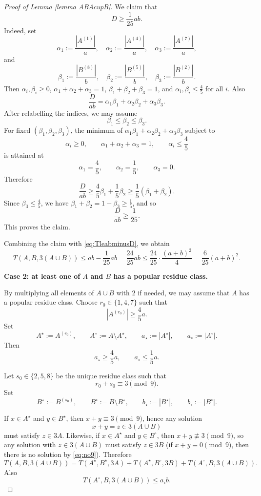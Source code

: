 \documentclass[12pt, notitlepage]{amsart}
\numberwithin{equation}{section}
\theoremstyle{remark}
\theoremstyle{definition}
\theoremstyle{remark}
\numberwithin{equation}{section}
\begin{document}
\begin{proof}[Proof of Lemma \ref{lemma ABAcupB}]
We claim that
\[
D\ge \frac1{25}ab.
\]
Indeed, set
\[
\alpha_1:=\frac{|A^{(1)}|}{a},\quad
\alpha_2:=\frac{|A^{(4)}|}{a},\quad
\alpha_3:=\frac{|A^{(7)}|}{a},
\]
and
\[
\beta_1:=\frac{|B^{(8)}|}{b},\quad
\beta_2:=\frac{|B^{(5)}|}{b},\quad
\beta_3:=\frac{|B^{(2)}|}{b}.
\]
Then $\alpha_i,\beta_i\ge 0$, $\alpha_1+\alpha_2+\alpha_3=1$, $\beta_1+\beta_2+\beta_3=1$, and $\alpha_i,\beta_i\le \frac45$ for all $i$. Also
\[
\frac{D}{ab}=\alpha_1\beta_1+\alpha_2\beta_2+\alpha_3\beta_3.
\]
After relabelling the indices, we may assume
\[
\beta_1\le \beta_2\le \beta_3.
\]
For fixed $(\beta_1,\beta_2,\beta_3)$, the minimum of $\alpha_1\beta_1+\alpha_2\beta_2+\alpha_3\beta_3$ subject to
\[
\alpha_i\ge 0,\qquad \alpha_1+\alpha_2+\alpha_3=1,\qquad \alpha_i\le \frac45
\]
is attained at
\[
\alpha_1=\frac45,\qquad \alpha_2=\frac15,\qquad \alpha_3=0.
\]
Therefore
\[
\frac{D}{ab}\ge \frac45\beta_1+\frac15\beta_2\ge \frac15(\beta_1+\beta_2).
\]
Since $\beta_3\le \frac45$, we have $\beta_1+\beta_2=1-\beta_3\ge \frac15$, and so
\[
\frac{D}{ab}\ge \frac1{25}.
\]
This proves the claim.

Combining the claim with \eqref{eq:TleabminusD}, we obtain
\[
T(A,B,3(A\cup B))\le ab-\frac1{25}ab=\frac{24}{25}ab
\le \frac{24}{25}\cdot \frac{(a+b)^2}{4}
=\frac6{25}(a+b)^2.
\]

\medskip
\noindent\textbf{Case 2: at least one of $A$ and $B$ has a popular residue class.}

By multiplying all elements of $A\cup B$ with $2$ if needed, we may assume that $A$ has a popular residue class. Choose $r_0\in\{1,4,7\}$ such that
\[
|A^{(r_0)}|\ge \frac45a.
\]
Set
\[
A^{\star}:=A^{(r_0)},\qquad A^{\circ}:=A\setminus A^{\star},
\qquad a_{\star}:=|A^{\star}|,\qquad a_{\circ}:=|A^{\circ}|.
\]
Then
\begin{equation}
\label{eq:astar}
a_{\star}\ge \frac45a,\qquad a_{\circ}\le \frac15a.
\end{equation}

Let $s_0\in\{2,5,8\}$ be the unique residue class such that
\[
r_0+s_0\equiv 3\pmod 9.
\]
Set
\[
B^{\star}:=B^{(s_0)},\qquad B^{\circ}:=B\setminus B^{\star},
\qquad b_{\star}:=|B^{\star}|,\qquad b_{\circ}:=|B^{\circ}|.
\]

If $x\in A^{\star}$ and $y\in B^{\star}$, then $x+y\equiv 3\pmod 9$, hence any solution
\[
x+y=z\in 3(A\cup B)
\]
must satisfy $z\in 3A$. Likewise, if $x\in A^{\star}$ and $y\in B^{\circ}$, then $x+y\not\equiv 3\pmod 9$, so any solution with $z\in 3(A\cup B)$ must satisfy $z\in 3B$ (if $x+y\equiv 0\pmod 9$, then there is no solution by \eqref{eq:no9}). Therefore
\begin{equation}
\label{eq:decomp}
T(A,B,3(A\cup B))
=
T(A^{\star},B^{\star},3A)
+
T(A^{\star},B^{\circ},3B)
+
T(A^{\circ},B,3(A\cup B)).
\end{equation}
Also
\begin{equation}
\label{eq:lasttrivial}
T(A^{\circ},B,3(A\cup B))\le a_{\circ}b.
\end{equation}


\end{proof}
\end{document}
